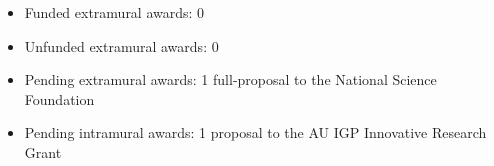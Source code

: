 \begin{itemize}
    \item Funded extramural awards: 0
    \item Unfunded extramural awards: 0
    \item Pending extramural awards: 1 full-proposal to the National Science Foundation
    \item Pending intramural awards: 1 proposal to the AU IGP Innovative Research Grant
\end{itemize}
